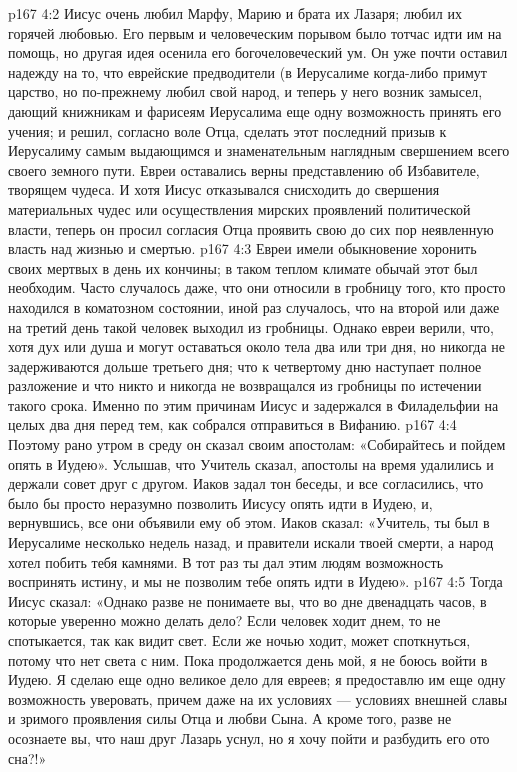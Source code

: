 \vs p167 4:2 \pc Иисус очень любил Марфу, Марию и брата их Лазаря; любил их горячей любовью. Его первым и человеческим порывом было тотчас идти им на помощь, но другая идея осенила его богочеловеческий ум. Он уже почти оставил надежду на то, что еврейские предводители (в Иерусалиме когда\hyp{}либо примут царство, но по\hyp{}прежнему любил свой народ, и теперь у него возник замысел, дающий книжникам и фарисеям Иерусалима еще одну возможность принять его учения; и решил, согласно воле Отца, сделать этот последний призыв к Иерусалиму самым выдающимся и знаменательным наглядным свершением всего своего земного пути. Евреи оставались верны представлению об Избавителе, творящем чудеса. И хотя Иисус отказывался снисходить до свершения материальных чудес или осуществления мирских проявлений политической власти, теперь он просил согласия Отца проявить свою до сих пор неявленную власть над жизнью и смертью.
\vs p167 4:3 \pc Евреи имели обыкновение хоронить своих мертвых в день их кончины; в таком теплом климате обычай этот был необходим. Часто случалось даже, что они относили в гробницу того, кто просто находился в коматозном состоянии, иной раз случалось, что на второй или даже на третий день такой человек выходил из гробницы. Однако евреи верили, что, хотя дух или душа и могут оставаться около тела два или три дня, но никогда не задерживаются дольше третьего дня; что к четвертому дню наступает полное разложение и что никто и никогда не возвращался из гробницы по истечении такого срока. Именно по этим причинам Иисус и задержался в Филадельфии на целых два дня перед тем, как собрался отправиться в Вифанию.
\vs p167 4:4 \pc Поэтому рано утром в среду он сказал своим апостолам: «Собирайтесь и пойдем опять в Иудею». Услышав, что Учитель сказал, апостолы на время удалились и держали совет друг с другом. Иаков задал тон беседы, и все согласились, что было бы просто неразумно позволить Иисусу опять идти в Иудею, и, вернувшись, все они объявили ему об этом. Иаков сказал: «Учитель, ты был в Иерусалиме несколько недель назад, и правители искали твоей смерти, а народ хотел побить тебя камнями. В тот раз ты дал этим людям возможность воспринять истину, и мы не позволим тебе опять идти в Иудею».
\vs p167 4:5 Тогда Иисус сказал: «Однако разве не понимаете вы, что во дне двенадцать часов, в которые уверенно можно делать дело? Если человек ходит днем, то не спотыкается, так как видит свет. Если же ночью ходит, может споткнуться, потому что нет света с ним. Пока продолжается день мой, я не боюсь войти в Иудею. Я сделаю еще одно великое дело для евреев; я предоставлю им еще одну возможность уверовать, причем даже на их условиях --- условиях внешней славы и зримого проявления силы Отца и любви Сына. А кроме того, разве не осознаете вы, что наш друг Лазарь уснул, но я хочу пойти и разбудить его ото сна?!»
